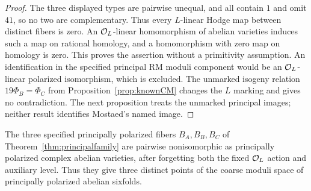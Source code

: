\begin{proof}
The three displayed types are pairwise unequal, and all contain $1$
and omit $41$, so no two are complementary. Thus every $L$-linear
Hodge map between distinct fibers is zero. An $\mathcal O_L$-linear
homomorphism of abelian varieties induces such a map on rational
homology, and a homomorphism with zero map on homology is zero.
This proves the assertion without a primitivity assumption.
An identification in the specified principal RM moduli component
would be an $\mathcal O_L$-linear polarized isomorphism, which is excluded.
The unmarked isogeny relation $19\Phi_B=\Phi_C$ from
Proposition~\ref{prop:knownCM} changes the $L$ marking and gives no
contradiction. The next proposition treats the unmarked principal
images; neither result identifies Mostaed's named image.
\end{proof}


\begin{proposition}
\label{pp:prop:unmarkeddistinct}
The three specified principally polarized fibers $B_A,B_B,B_C$ of
Theorem~\ref{thm:principalfamily} are pairwise nonisomorphic as principally
polarized complex abelian varieties, after forgetting both the fixed
$\mathcal O_L$ action and auxiliary level. Thus they give three distinct points
of the coarse moduli space of principally polarized abelian sixfolds.
\end{proposition}
